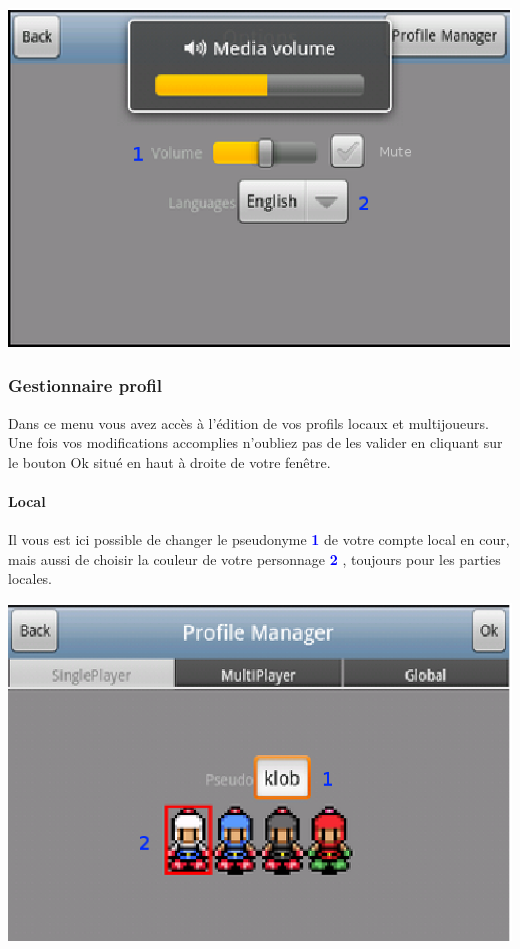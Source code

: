 	\begin{center}
		\includegraphics[scale=0.7]{Manuel/Img/4.eps}
	\end{center}
	
	\subsubsection{Gestionnaire profil}
		Dans ce menu vous avez accès à l'édition de vos profils locaux et
		multijoueurs. Une fois vos modifications accomplies n'oubliez pas de les
		valider en cliquant sur le bouton Ok situé en haut à droite de votre fenêtre.
		\paragraph{Local\\}
		Il vous est ici possible de changer le pseudonyme \textcolor{blue}{\textbf{1}}
		de votre compte local en cour, mais aussi de choisir la couleur de votre
		personnage \textcolor{blue}{\textbf{2}} , toujours pour les parties locales.
		\begin{center}
				\includegraphics[scale=0.7]{Manuel/Img/5.eps}
			\end{center}
		
